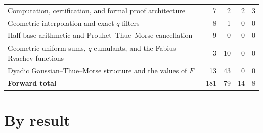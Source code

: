 \documentclass[11pt,a4paper,oneside,openany]{book}
\theoremstyle{definition}
\theoremstyle{remark}
\begin{document}
\begin{center}
\begin{tabular}{@{}p{}rrrr@{}}
Computation, certification, and formal proof architecture & 7 & 2 & 2 & 3\\
Geometric interpolation and exact $q$-filters & 8 & 1 & 0 & 0\\
Half-base arithmetic and Prouhet--Thue--Morse cancellation & 9 & 0 & 0 & 0\\
Geometric uniform sums, $q$-cumulants, and the Fabius--Rvachev functions & 3 & 10 & 0 & 0\\
Dyadic Gaussian--Thue--Morse structure and the values of $F$ & 13 & 43 & 0 & 0\\
\midrule
\textbf{Forward total} & 181 & 79 & 14 & 8\\
\bottomrule
\end{tabular}
\end{center}

\section{By result}
\end{document}
